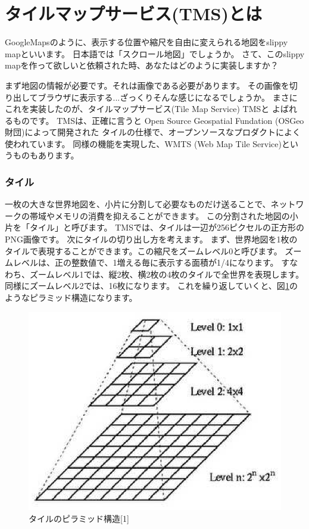 \chapter*{タイルマップサービス(TMS)とは}

GoogleMapsのように、表示する位置や縮尺を自由に変えられる地図をslippy mapといいます。
日本語では「スクロール地図」でしょうか。
さて、このslippy mapを作って欲しいと依頼された時、あなたはどのように実装しますか？

まず地図の情報が必要です。それは画像である必要があります。
その画像を切り出してブラウザに表示する...ざっくりそんな感じになるでしょうか。
まさにこれを実装したのが、タイルマップサービス(Tile Map Service) TMSと
よばれるものです。
%
TMSは、正確に言うと Open Source Geospatial Fundation (OSGeo財団)によって開発された
タイルの仕様で、オープンソースなプロダクトによく使われています。
同様の機能を実現した、WMTS (Web Map Tile Service)というものもあります。

\subsection*{タイル}
一枚の大きな世界地図を、小片に分割して必要なものだけ送ることで、ネットワークの帯域やメモリの消費を抑えることができます。
この分割された地図の小片を「タイル」と呼びます。
TMSでは、タイルは一辺が256ピクセルの正方形のPNG画像です。
次にタイルの切り出し方を考えます。
まず、世界地図を1枚のタイルで表現することができます。この縮尺をズームレベル0と呼びます。
ズームレベルは、正の整数値で、1増える毎に表示する面積が1/4になります。
すなわち、ズームレベル1では、縦2枚、横2枚の4枚のタイルで全世界を表現します。
同様にズームレベル2では、16枚になります。
これを繰り返していくと、図\ref{fig:tile_pylamid}のようなピラミッド構造になります。

\begin{figure}[thbp]
\centering
\includegraphics{Tiling.eps}
\caption{タイルのピラミッド構造[1]}
\label{fig:tile_pylamid}
\end{figure}

